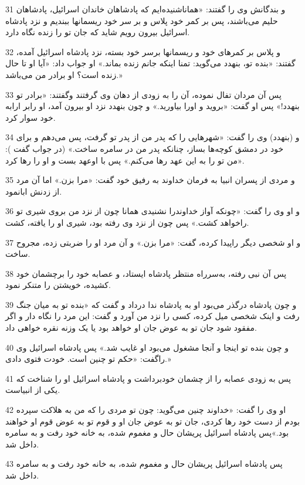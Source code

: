 \par 31 و بندگانش وی را گفتند: «هماناشنیده‌ایم که پادشاهان خاندان اسرائیل، پادشاهان حلیم می‌باشند، پس بر کمر خود پلاس و بر سر خود ریسمانها ببندیم و نزد پادشاه اسرائیل بیرون رویم شاید که جان تو را زنده نگاه دارد.
\par 32 و پلاس بر کمرهای خود و ریسمانها برسر خود بسته، نزد پادشاه اسرائیل آمده، گفتند: «بنده تو، بنهدد می‌گوید: تمنا اینکه جانم زنده بماند.» او جواب داد: «آیا او تا حال زنده است؟ او برادر من می‌باشد.»
\par 33 پس آن مردان تفال نموده، آن را به زودی از دهان وی گرفتند وگفتند: «برادر تو بنهدد!» پس او گفت: «بروید و اورا بیاورید.» و چون بنهدد نزد او بیرون آمد، او رابر ارابه خود سوار کرد.
\par 34 و (بنهدد) وی را گفت: «شهرهایی را که پدر من از پدر تو گرفت، پس می‌دهم و برای خود در دمشق کوچه‌ها بساز، چنانکه پدر من در سامره ساخت.» (در جواب گفت ): «من تو را به این عهد رها می‌کنم.» پس با اوعهد بست و او را رها کرد.
\par 35 و مردی از پسران انبیا به فرمان خداوند به رفیق خود گفت: «مرا بزن.» اما آن مرد از زدنش ابانمود.
\par 36 و او وی را گفت: «چونکه آواز خداوندرا نشنیدی همانا چون از نزد من بروی شیری تو راخواهد کشت.» پس چون از نزد وی رفته بود، شیری او را یافته، کشت.
\par 37 و او شخصی دیگر راپیدا کرده، گفت: «مرا بزن.» و آن مرد او را ضربتی زده، مجروح ساخت.
\par 38 پس آن نبی رفته، به‌سرراه منتظر پادشاه ایستاد، و عصابه خود را برچشمان خود کشیده، خویشتن را متنکر نمود.
\par 39 و چون پادشاه درگذر می‌بود او به پادشاه ندا درداد و گفت که «بنده تو به میان جنگ رفت و اینک شخصی میل کرده، کسی را نزد من آورد و گفت: این مرد را نگاه دار و اگر مفقود شود جان تو به عوض جان او خواهد بود یا یک وزنه نقره خواهی داد.
\par 40 و چون بنده تو اینجا و آنجا مشغول می‌بود او غایب شد.» پس پادشاه اسرائیل وی راگفت: «حکم تو چنین است. خودت فتوی دادی.»
\par 41 پس به زودی عصابه را از چشمان خودبرداشت و پادشاه اسرائیل او را شناخت که یکی از انبیاست.
\par 42 او وی را گفت: «خداوند چنین می‌گوید: چون تو مردی را که من به هلاکت سپرده بودم از دست خود رها کردی، جان تو به عوض جان او و قوم تو به عوض قوم او خواهند بود.»پس پادشاه اسرائیل پریشان حال و مغموم شده، به خانه خود رفت و به سامره داخل شد.
\par 43 پس پادشاه اسرائیل پریشان حال و مغموم شده، به خانه خود رفت و به سامره داخل شد.
 
